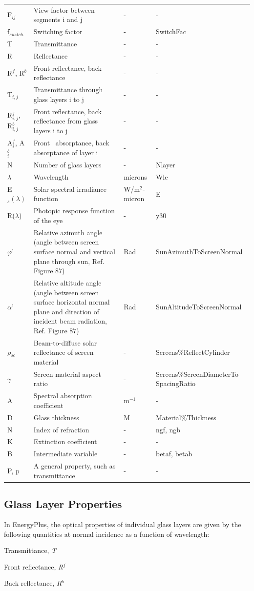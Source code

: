 \begin{longtable}[c]{p{1.0in}p{2.5in}p{1.0in}p{1.5in}}
F\(_{ij}\) & View factor between segments i and j & - & - \tabularnewline
f\(_{switch}\) & Switching factor & - & SwitchFac \tabularnewline
T & Transmittance & - & - \tabularnewline
R & Reflectance & - & - \tabularnewline
R\(^f\), R\(^b\) & Front reflectance, back reflectance & - & - \tabularnewline
T\(_{i,j}\) & Transmittance through glass layers i to j & - & - \tabularnewline
R\(^f_{i,j}\), R\(^b_{i,j}\) & Front reflectance, back reflectance from glass layers i to j & - & - \tabularnewline
A\(^f_i\), A\(^b_i\) & Front~ absorptance, back absorptance of layer i & - & - \tabularnewline
N & Number of glass layers & - & Nlayer \tabularnewline
\(\lambda\) & Wavelength & microns & Wle \tabularnewline
E\(_s (\lambda)\) & Solar spectral irradiance function & W/m\(^2\)-micron & E \tabularnewline
R($\lambda$) & Photopic response function of the eye & - & y30 \tabularnewline
$\varphi$' & Relative azimuth angle (angle between screen surface normal and vertical plane through sun, Ref. Figure 87) & Rad & SunAzimuthToScreenNormal \tabularnewline
$\alpha$' & Relative altitude angle (angle between screen surface horizontal normal plane and direction of incident beam radiation, Ref. Figure 87) & Rad & SunAltitudeToScreenNormal \tabularnewline
$\rho$\(_{sc}\) & Beam-to-diffuse solar reflectance of screen material & - & Screens\%ReflectCylinder \tabularnewline
$\gamma$ & Screen material aspect ratio & - & Screens\%ScreenDiameterTo SpacingRatio \tabularnewline
Α & Spectral absorption coefficient & m\(^{-1}\) & - \tabularnewline
D & Glass thickness & M & Material\%Thickness \tabularnewline
N & Index of refraction & - & ngf, ngb \tabularnewline
Κ & Extinction coefficient & - & - \tabularnewline
Β & Intermediate variable & - & betaf, betab \tabularnewline
P, p & A general property, such as transmittance & - & - \tabularnewline
\bottomrule
\end{longtable}

\subsection{Glass Layer Properties}\label{glass-layer-properties}

In EnergyPlus, the optical properties of individual glass layers are given by the following quantities at normal incidence as a function of wavelength:

Transmittance, \emph{T}

Front reflectance, \emph{R\(^{f}\)}

Back reflectance, \emph{R\(^{b}\)}

